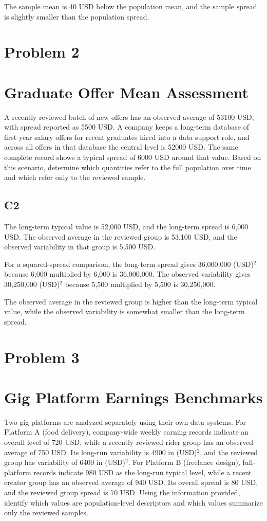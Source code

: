 \begin{ExamProblems}
		The sample mean is 40 USD below the population mean, and the sample spread is slightly smaller than the population spread.

		\newpage
		\item
		\section{Problem 2}
		\section{Graduate Offer Mean Assessment}
		A recently reviewed batch of new offers has an observed average of 53100 USD, with spread reported as 5500 USD.
		A company keeps a long-term database of first-year salary offers for recent graduates hired into a data support role, and across all offers in that database the central level is 52000 USD.
		The same complete record shows a typical spread of 6000 USD around that value.
		Based on this scenario, determine which quantities refer to the full population over time and which refer only to the reviewed sample.

\subsection*{C2}
		The long-term typical value is 52,000 USD, and the long-term spread is 6,000 USD.
		The observed average in the reviewed group is 53,100 USD, and the observed variability in that group is 5,500 USD.

		For a squared-spread comparison, the long-term spread gives 36,000,000 (USD)$^2$ because 6,000 multiplied by 6,000 is 36,000,000.
		The observed variability gives 30,250,000 (USD)$^2$ because 5,500 multiplied by 5,500 is 30,250,000.

		The observed average in the reviewed group is higher than the long-term typical value, while the observed variability is somewhat smaller than the long-term spread.


		\newpage
		\item
		\section{Problem 3}
		\section{Gig Platform Earnings Benchmarks}
		Two gig platforms are analyzed separately using their own data systems.
		For Platform A (food delivery), company-wide weekly earning records indicate an overall level of 720 USD, while a recently reviewed rider group has an observed average of 750 USD.
		Its long-run variability is 4900 in (USD)$^2$, and the reviewed group has variability of 6400 in (USD)$^2$.
		For Platform B (freelance design), full-platform records indicate 980 USD as the long-run typical level, while a recent creator group has an observed average of 940 USD.
		Its overall spread is 80 USD, and the reviewed group spread is 70 USD.
		Using the information provided, identify which values are population-level descriptors and which values summarize only the reviewed samples.


\end{ExamProblems}
